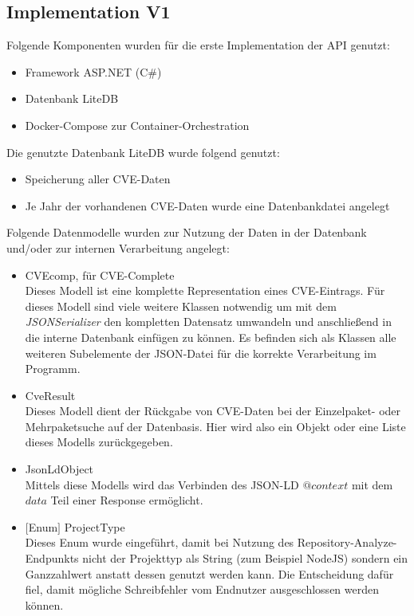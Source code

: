 \subsection{Implementation V1} \label{sec:Implementation1}
    Folgende Komponenten wurden für die erste Implementation der \ac{API} genutzt:
    \begin{itemize}
        \item Framework ASP.NET (C\#)
        \item Datenbank LiteDB
        \item Docker-Compose zur Container-Orchestration
    \end{itemize}

    \noindent Die genutzte Datenbank LiteDB wurde folgend genutzt:
    \begin{itemize}
        \item Speicherung aller \ac{CVE}-Daten
        \item Je Jahr der vorhandenen \ac{CVE}-Daten wurde eine Datenbankdatei angelegt
    \end{itemize}

    \noindent Folgende Datenmodelle wurden zur Nutzung der Daten in der Datenbank und/oder zur internen Verarbeitung angelegt:
    \begin{itemize}
        \item CVEcomp, für CVE-Complete \\
            Dieses Modell ist eine komplette Representation eines \ac{CVE}-Eintrags.
            Für dieses Modell sind viele weitere Klassen notwendig um mit dem \textit{JSONSerializer} den kompletten Datensatz umwandeln und anschließend in die interne Datenbank einfügen zu können.
            Es befinden sich als Klassen alle weiteren Subelemente der \ac{JSON}-Datei für die korrekte Verarbeitung im Programm.
        \item CveResult \\
            Dieses Modell dient der Rückgabe von \ac{CVE}-Daten bei der Einzelpaket- oder Mehrpaketsuche auf der Datenbasis.
            Hier wird also ein Objekt oder eine Liste dieses Modells zurückgegeben.
        \item JsonLdObject \\
            Mittels diese Modells wird das Verbinden des \ac{JSON-LD} \textit{$@context$} mit dem \textit{$data$} Teil einer Response ermöglicht.
        \item $[$Enum$]$ ProjectType \\
            Dieses Enum wurde eingeführt, damit bei Nutzung des Repository-Analyze-Endpunkts nicht der Projekttyp als String (zum Beispiel NodeJS) sondern ein Ganzzahlwert anstatt dessen genutzt werden kann.
            Die Entscheidung dafür fiel, damit mögliche Schreibfehler vom Endnutzer ausgeschlossen werden können.
    \end{itemize}

